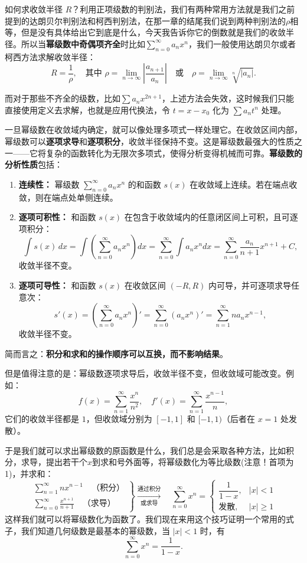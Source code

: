 \documentclass[UTF8]{ctexbook}
\begin{document}
如何求收敛半径 $R$？利用正项级数的判别法，我们有两种常用方法就是我们之前提到的达朗贝尔判别法和柯西判别法，在那一章的结尾我们说到两种判别法的$\rho$相等，但是没有具体给出它到底是什么，今天我告诉你它的倒数就是我们的收敛半径。所以当\textbf{幂级数中奇偶项齐全}时比如$\displaystyle\sum_{n=0}^\infty a_n x^n$，我们一般使用达朗贝尔或者柯西方法求解收敛半径：
\[
    R = \frac{1}{\rho}, \quad \text{其中 } \rho = \lim_{n\to\infty}\left|\frac{a_{n+1}}{a_n}\right| \quad \text{或} \quad \rho = \lim_{n\to\infty}\sqrt[n]{|a_n|}.
    \]

而对于那些不齐全的级数，比如$\sum a_n x^{2n+1}$，上述方法会失效，这时候我们只能直接使用定义去求解，也就是应用代换法，令 $t=x-x_0$ 化为 $\sum a_n t^n$ 处理。

一旦幂级数在收敛域内确定，就可以像处理多项式一样处理它。在收敛区间内部，幂级数可以\textbf{逐项求导}和\textbf{逐项积分}，收敛半径保持不变。这是幂级数最强大的性质之一——它将复杂的函数转化为无限次多项式，使得分析变得机械而可靠。\noindent\textbf{幂级数的分析性质}包括：
\begin{enumerate}
    \item \textbf{连续性：} 幂级数 $\sum_{n=0}^\infty a_n x^n$ 的和函数 $s(x)$ 在收敛域上连续。若在端点收敛，则在端点处单侧连续。
    \item \textbf{逐项可积性：} 和函数 $s(x)$ 在包含于收敛域内的任意闭区间上可积，且可逐项积分：
    \[
    \int s(x)\,dx = \int \left( \sum_{n=0}^\infty a_n x^n \right) dx = \sum_{n=0}^\infty \int a_n x^n dx = \sum_{n=0}^\infty \frac{a_n}{n+1} x^{n+1} + C,
    \]
    收敛半径不变。
    \item \textbf{逐项可导性：} 和函数 $s(x)$ 在收敛区间 $(-R,R)$ 内可导，并可逐项求导任意次：
    \[
    s'(x) = \left( \sum_{n=0}^\infty a_n x^n \right)' = \sum_{n=0}^\infty (a_n x^n)' = \sum_{n=1}^\infty n a_n x^{n-1},
    \]
    收敛半径不变。
\end{enumerate}

简而言之：\textbf{积分和求和的操作顺序可以互换，而不影响结果}。

但是值得注意的是：幂级数逐项求导后，收敛半径不变，但收敛域可能改变。例如：
\[
f(x) = \sum_{n=1}^\infty \frac{x^n}{n^2}, \quad f'(x) = \sum_{n=1}^\infty \frac{x^{n-1}}{n},
\]
它们的收敛半径都是 $1$，但收敛域分别为 $[-1,1]$ 和 $[-1,1)$（后者在 $x=1$ 处发散）。

于是我们就可以求出幂级数的原函数是什么，我们总是会采取各种方法，比如积分，求导，提出若干个$x$到求和号外面等，将幂级数化为等比级数(注意！首项为1)，并求和：
\[
\left.
\begin{array}{c}
\displaystyle \sum_{n=1}^{\infty} nx^{n-1} \quad \text{（积分）} \\[1.5em]
\displaystyle \sum_{n=0}^{\infty} \frac{x^{n+1}}{n+1} \quad \text{（求导）}
\end{array}
\right\}
\xrightarrow[\text{或求导}]{\text{通过积分}}
\quad
\sum_{n=0}^{\infty} x^n = 
\begin{cases}
\dfrac{1}{1-x}, & |x| < 1 \\[1em]
\text{发散}, & |x| \geq 1
\end{cases}
\]
这样我们就可以将幂级数化为函数了。我们现在来用这个技巧证明一个常用的式子，我们知道几何级数是最基本的幂级数，当 $|x|<1$ 时，有
\[
    \sum_{n=0}^{\infty} x^n = \frac{1}{1-x}. 
\]
\end{document}
